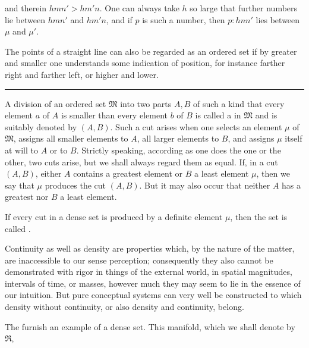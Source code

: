 and therein $hmn'>hm'n$. One can always take $h$ so large that
further numbers lie between $hmn'$ and $hm'n$, and if $p$ is such a
number, then $p:hnn'$ lies between $\mu$ and $\mu'$.

The points of a straight line can also be regarded as an ordered set
if by greater and smaller one understands some indication of position,
for instance farther right and farther left, or higher and lower.

\begin{center}
\rule{0.18\linewidth}{0.4pt}
\end{center}

A division of an ordered set $\mathfrak M$ into two parts $A,B$ of
such a kind that every element $a$ of $A$ is smaller than every
element $b$ of $B$ is called a  in $\mathfrak M$ and is
suitably denoted by $(A,B)$. Such a cut arises when one selects an
element $\mu$ of $\mathfrak M$, assigns all smaller elements to $A$,
all larger elements to $B$, and assigns $\mu$ itself at will to $A$
or to $B$. Strictly speaking, according as one does the one or the
other, two cuts arise, but we shall always regard them as equal. If,
in a cut $(A,B)$, either $A$ contains a greatest element or $B$ a
least element $\mu$, then we say that $\mu$ produces the cut $(A,B)$.
But it may also occur that neither $A$ has a greatest nor $B$ a least
element.

If every cut in a dense set is produced by a definite element $\mu$,
then the set is called .

Continuity as well as density are properties which, by the nature of
the matter, are inaccessible to our sense perception; consequently
they also cannot be demonstrated with rigor in things of the external
world, in spatial magnitudes, intervals of time, or masses, however
much they may seem to lie in the essence of our intuition. But pure
conceptual systems can very well be constructed to which density
without continuity, or also density and continuity, belong\footnotemark[1].

The  furnish an example of a dense set.
This manifold, which we shall denote by $\mathfrak R$,
